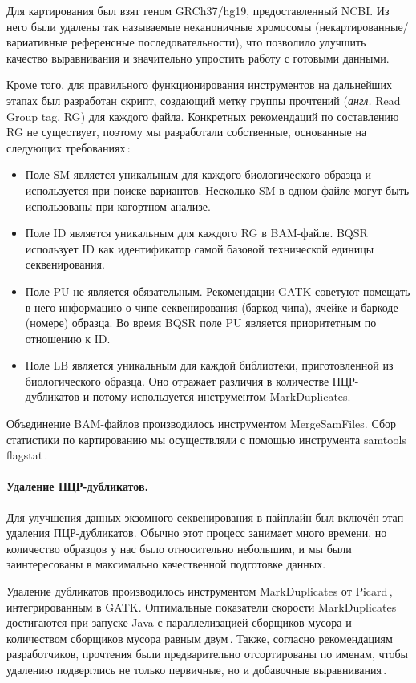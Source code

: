 \documentclass[a4paper,14pt]{extarticle}
\newcommand{\anglia}[1]{\textit{англ.} \textenglish{#1}}
\begin{document}
Для картирования был взят геном GRCh37/hg19, предоставленный NCBI.
Из него были удалены так называемые неканоничные хромосомы (некартированные/вариативные референсные последовательности), что позволило улучшить качество выравнивания и значительно упростить работу с готовыми данными.

Кроме того, для правильного функционирования инструментов на дальнейших этапах был разработан скрипт, создающий метку группы прочтений (\anglia{Read Group tag, RG}) для каждого файла.
Конкретных рекомендаций по составлению RG не существует, поэтому мы разработали собственные, основанные на следующих требованиях\,\cite{Auwera_2013}:

\begin{itemize}
\item Поле SM является уникальным для каждого биологического образца и используется при поиске вариантов.
Несколько SM в одном файле могут быть использованы при когортном анализе.
\item Поле ID является уникальным для каждого RG в BAM-файле.
BQSR использует ID как идентификатор самой базовой технической единицы секвенирования.
\item Поле PU не является обязательным.
Рекомендации GATK советуют помещать в него информацию о чипе секвенирования (баркод чипа), ячейке и баркоде (номере) образца.
Во время BQSR поле PU является приоритетным по отношению к ID.
\item Поле LB является уникальным для каждой библиотеки, приготовленной из биологического образца.
Оно отражает различия в количестве ПЦР\hyp{}дубликатов и потому используется инструментом MarkDuplicates.
\end{itemize}

Объединение BAM-файлов производилось инструментом MergeSamFiles.
Сбор статистики по картированию мы осуществляли с помощью инструмента samtools flagstat\,\cite{Li_2009_SAMTools}.

\paragraph{Удаление ПЦР\hyp{}дубликатов.}
Для улучшения данных экзомного секвенирования в пайплайн был включён этап удаления ПЦР\hyp{}дубликатов.
Обычно этот процесс занимает много времени, но количество образцов у нас было относительно небольшим, и мы были заинтересованы в максимально качественной подготовке данных.

Удаление дубликатов производилось инструментом MarkDuplicates от Picard\,\cite{PicardTools}, интегрированным в GATK.
Оптимальные показатели скорости MarkDuplicates достигаются при запуске Java с параллелизацией сборщиков мусора и количеством сборщиков мусора равным двум\,\cite{Heldenbrand_2019}.
Также, согласно рекомендациям разработчиков, прочтения были предварительно отсортированы по именам, чтобы удалению подверглись не только первичные, но и добавочные выравнивания\,\cite{Auwera_2013}.
\end{document}
